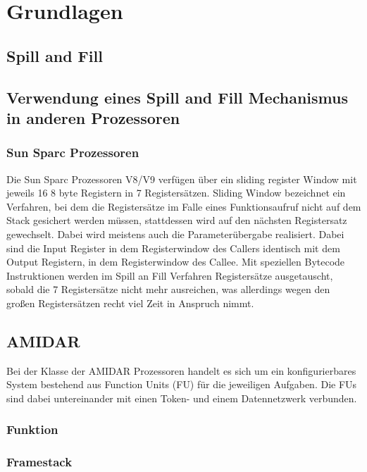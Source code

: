 \chapter{Grundlagen}
\label{cha:Grundlagen}

\section{Spill and Fill}
\section{Verwendung eines Spill and Fill Mechanismus in anderen Prozessoren}
\subsection{Sun Sparc Prozessoren}
Die Sun Sparc Prozessoren V8/V9 verfügen über ein sliding register Window mit jeweils 16 8 byte Registern in 7 Registersätzen. Sliding Window bezeichnet ein Verfahren, bei dem die Registersätze im Falle eines Funktionsaufruf nicht auf dem Stack gesichert werden müssen, stattdessen wird auf den nächsten Registersatz gewechselt. Dabei wird meistens auch die Parameterübergabe realisiert. Dabei sind die Input Register in dem Registerwindow des Callers identisch mit dem Output Registern, in dem Registerwindow des Callee.   
Mit speziellen Bytecode Instruktionen werden im Spill an Fill Verfahren Registersätze ausgetauscht, sobald die 7 Registersätze nicht mehr ausreichen, was allerdings wegen den großen Registersätzen recht viel Zeit in Anspruch nimmt.
\section{AMIDAR}
Bei der Klasse der AMIDAR Prozessoren handelt es sich um ein konfigurierbares System bestehend aus Function Units (FU) für die jeweiligen Aufgaben. Die FUs sind dabei untereinander mit einen Token- und einem Datennetzwerk verbunden. 
\subsection{Funktion}



\subsection{Framestack}